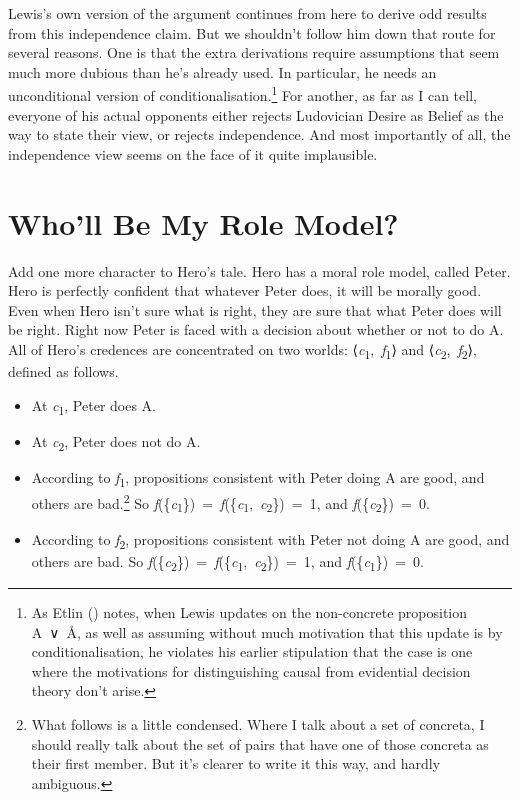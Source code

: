 \documentclass[
  10pt,
  letterpaper,
  DIV=11,
  numbers=noendperiod,
  twoside]{scrartcl}
\providecommand{\tightlist}{%
  \setlength{\itemsep}{0pt}\setlength{\parskip}{0pt}}\usepackage{longtable,booktabs,array}
\begin{document}
Lewis's own version of the argument continues from here to derive odd
results from this independence claim. But we shouldn't follow him down
that route for several reasons. One is that the extra derivations
require assumptions that seem much more dubious than he's already used.
In particular, he needs an unconditional version of
conditionalisation.\footnote{As Etlin () notes, when Lewis updates on the non-concrete proposition A~∨~Å,
  as well as assuming without much motivation that this update is by
  conditionalisation, he violates his earlier stipulation that the case
  is one where the motivations for distinguishing causal from evidential
  decision theory don't arise.} For another, as far as I can tell,
everyone of his actual opponents either rejects Ludovician Desire as
Belief as the way to state their view, or rejects independence. And most
importantly of all, the independence view seems on the face of it quite
implausible.

\section{Who'll Be My Role Model?}\label{wholl-be-my-role-model}

Add one more character to Hero's tale. Hero has a moral role model,
called Peter. Hero is perfectly confident that whatever Peter does, it
will be morally good. Even when Hero isn't sure what is right, they are
sure that what Peter does will be right. Right now Peter is faced with a
decision about whether or not to do A. All of Hero's credences are
concentrated on two worlds:
⟨\emph{c}\textsubscript{1},~\emph{f}\textsubscript{1}⟩ and
⟨\emph{c}\textsubscript{2},~\emph{f}\textsubscript{2}⟩, defined as
follows.

\begin{itemize}
\tightlist
\item
  At \emph{c}\textsubscript{1}, Peter does A.
\item
  At \emph{c}\textsubscript{2}, Peter does not do A.
\item
  According to \emph{f}\textsubscript{1}, propositions consistent with
  Peter doing A are good, and others are bad.\footnote{What follows is a
    little condensed. Where I talk about a set of concreta, I should
    really talk about the set of pairs that have one of those concreta
    as their first member. But it's clearer to write it this way, and
    hardly ambiguous.} So
  \emph{f}(\{\emph{c}\textsubscript{1}\})~=~\emph{f}(\{\emph{c}\textsubscript{1},~\emph{c}\textsubscript{2}\})~=~1,
  and \emph{f}(\{\emph{c}\textsubscript{2}\})~=~0.
\item
  According to \emph{f}\textsubscript{2}, propositions consistent with
  Peter not doing A are good, and others are bad. So
  \emph{f}(\{\emph{c}\textsubscript{2}\})~=~\emph{f}(\{\emph{c}\textsubscript{1},~\emph{c}\textsubscript{2}\})~=~1,
  and \emph{f}(\{\emph{c}\textsubscript{1}\})~=~0.
\end{itemize}
\end{document}
